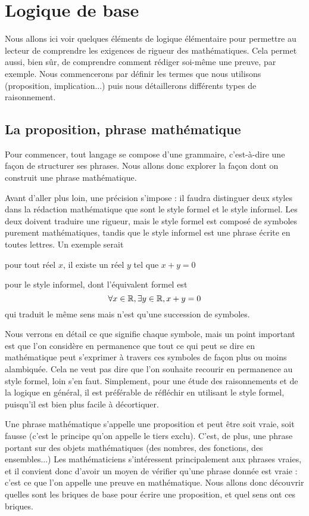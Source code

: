 \section{Logique de base}

Nous allons ici voir quelques éléments de logique élémentaire pour permettre au lecteur de comprendre les exigences de rigueur des mathématiques. Cela permet aussi, bien sûr, de comprendre comment rédiger soi-même une preuve, par exemple. Nous commencerons par définir les termes que nous utilisons (proposition, implication...) puis nous détaillerons différents types de raisonnement.

\subsection{La proposition, phrase mathématique}

Pour commencer, tout langage se compose d'une grammaire, c'est-à-dire une façon de structurer ses phrases. Nous allons donc explorer la façon dont on construit une phrase mathématique.

Avant d'aller plus loin, une précision s'impose : il faudra distinguer deux styles dans la rédaction mathématique que sont le style formel et le style informel. Les deux doivent traduire une rigueur, mais le style formel est composé de symboles purement mathématiques, tandis que le style informel est une phrase écrite en toutes lettres. Un exemple serait \begin{center}\og pour tout réel $x$, il existe un réel $y$ tel que $x+y=0$\fg{} \end{center} pour le style informel, dont l'équivalent formel est $$\forall x\in \mathbb{R},\exists y\in \mathbb{R}, x+y=0$$ qui traduit le même sens mais n'est qu'une succession de symboles.

Nous verrons en détail ce que signifie chaque symbole, mais un point important est que l'on considère en permanence que tout ce qui peut se dire en mathématique peut s'exprimer à travers ces symboles de façon plus ou moins alambiquée. Cela ne veut pas dire que l'on souhaite recourir en permanence au style formel, loin s'en faut. Simplement, pour une étude des raisonnements et de la logique en général, il est préférable de réfléchir en utilisant le style formel, puisqu'il est bien plus facile à décortiquer.

Une phrase mathématique s'appelle une proposition et peut être soit vraie, soit fausse (c'est le principe qu'on appelle le tiers exclu). C'est, de plus, une phrase portant sur des objets mathématiques (des nombres, des fonctions, des ensembles...) Les mathématiciens s'intéressent principalement aux phrases vraies, et il convient donc d'avoir un moyen de vérifier qu'une phrase donnée est vraie : c'est ce que l'on appelle une preuve en mathématique. Nous allons donc découvrir quelles sont les briques de base pour écrire une proposition, et quel sens ont ces briques.

